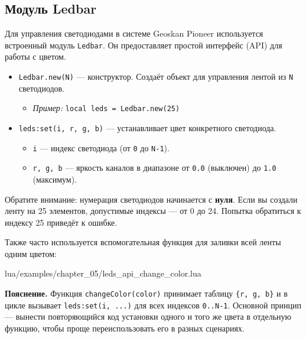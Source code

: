\subsection{Модуль Ledbar}

Для управления светодиодами в системе Geoskan Pioneer используется встроенный модуль \texttt{Ledbar}. Он предоставляет простой интерфейс (API) для работы с цветом.

\begin{codebox}
\begin{itemize}
  \item \texttt{Ledbar.new(N)} — конструктор. Создаёт объект для управления лентой из \texttt{N} светодиодов.
  \begin{itemize}
      \item \textit{Пример:} \texttt{local leds = Ledbar.new(25)}
  \end{itemize}
  
  \item \texttt{leds:set(i, r, g, b)} — устанавливает цвет конкретного светодиода.
  \begin{itemize}
      \item \texttt{i} — индекс светодиода (от \texttt{0} до \texttt{N-1}).
      \item \texttt{r, g, b} — яркость каналов в диапазоне от \texttt{0.0} (выключен) до \texttt{1.0} (максимум).
  \end{itemize}
\end{itemize}
\end{codebox}

\begin{warnbox}[Индексация]
Обратите внимание: нумерация светодиодов начинается с \textbf{нуля}. Если вы создали ленту на 25 элементов, допустимые индексы — от 0 до 24. Попытка обратиться к индексу 25 приведёт к ошибке.
\end{warnbox}

Также часто используется вспомогательная функция для заливки всей ленты одним цветом:
\begin{codebox}
\begin{codefile}{lua/examples/chapter_05/leds_api_change_color.lua}
\end{codefile}
\end{codebox}

\textbf{Пояснение.} Функция \verb|changeColor(color)| принимает таблицу \verb|{r, g, b}| и в цикле вызывает \verb|leds:set(i, ...)| для всех индексов \verb|0..N-1|. Основной принцип — вынести повторяющийся код установки одного и того же цвета в отдельную функцию, чтобы проще переиспользовать его в разных сценариях.
